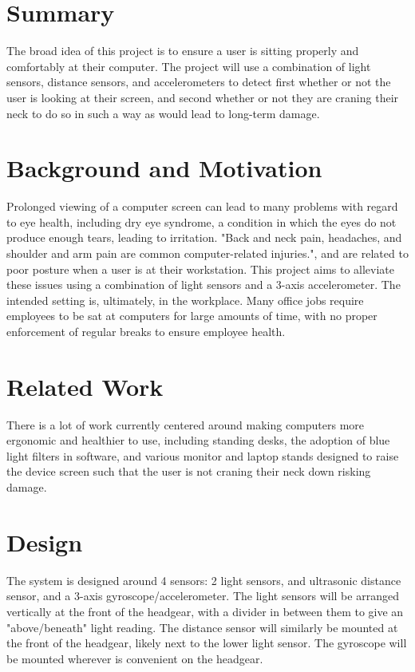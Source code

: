 \documentclass[12pt, a4paper]{report}
\begin{document}
\maketitle

\tableofcontents
\pagebreak

\section{Summary}
The broad idea of this project is to ensure a user is sitting properly and comfortably at their computer.
The project will use a combination of light sensors, distance sensors, and accelerometers to detect first whether or not the user is looking at their screen, and second whether or not they are craning their neck to do so in such a way as would lead to long-term damage.

\section{Background and Motivation}
Prolonged viewing of a computer screen can lead to many problems with regard to eye health, including dry eye syndrome\cite{dryeyes}, a condition in which the eyes do not produce enough tears, leading to irritation.
"Back and neck pain, headaches, and shoulder and arm pain are common computer-related injuries."\cite{vicgov}, and are related to poor posture when a user is at their workstation.
This project aims to alleviate these issues using a combination of light sensors and a 3-axis accelerometer.
The intended setting is, ultimately, in the workplace.
Many office jobs require employees to be sat at computers for large amounts of time, with no proper enforcement of regular breaks to ensure employee health.

\section{Related Work}
There is a lot of work currently centered around making computers more ergonomic and healthier to use, including standing desks, the adoption of blue light filters in software, and various monitor and laptop stands designed to raise the device screen such that the user is not craning their neck down risking damage.

\section{Design}

The system is designed around 4 sensors: 2 light sensors, and ultrasonic distance sensor, and a 3-axis gyroscope/accelerometer.
The light sensors will be arranged vertically at the front of the headgear, with a divider in between them to give an "above/beneath" light reading.
The distance sensor will similarly be mounted at the front of the headgear, likely next to the lower light sensor.
The gyroscope will be mounted wherever is convenient on the headgear.
\end{document}
